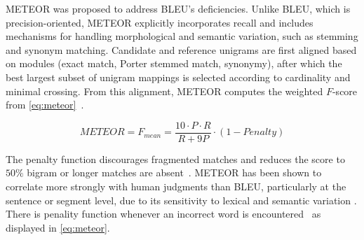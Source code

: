 METEOR was proposed to address BLEU’s deficiencies. 
Unlike BLEU, which is precision-oriented, METEOR explicitly incorporates recall and includes mechanisms for handling morphological and semantic variation, such as stemming and synonym matching. 
Candidate and reference unigrams are first aligned based on modules (exact match, Porter stemmed match, synonymy), after which the best largest subset of unigram mappings is selected according to cardinality and minimal crossing. 
From this alignment, METEOR computes the weighted $F$-score from \autoref{eq:meteor}~\citep{banerjee_METEOR_2005}.

\begin{equation}
    METEOR = F_{mean} = \frac{10 \cdot P \cdot R}{R + 9P} \cdot (1 - Penalty)
\label{eq:meteor}
\end{equation}

The penalty function discourages fragmented matches and reduces the score to $50\%$ bigram or longer matches are absent~\citep{banerjee_METEOR_2005}. 
METEOR has been shown to correlate more strongly with human judgments than BLEU, particularly at the sentence or segment level, due to its sensitivity to lexical and semantic variation \citep{zhou_paraphrase_2021,kurt_pehlivanoglu_comparative_2024}.
There is penality function whenever an incorrect word is encountered~\citep{palivela_optimization_2021} as displayed in \autoref{eq:meteor}.


